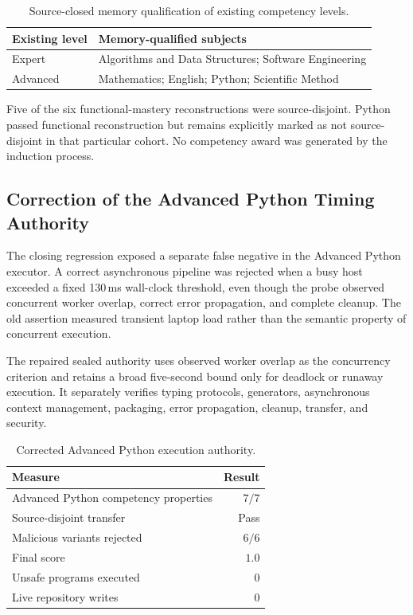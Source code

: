 \begin{table}[htbp]
\centering
\caption{Source-closed memory qualification of existing competency levels.}
\label{tab:memory-qualified-levels}
\begin{tabular}{ll}
\hline
\textbf{Existing level} & \textbf{Memory-qualified subjects} \\
\hline
Expert & Algorithms and Data Structures; Software Engineering \\
Advanced & Mathematics; English; Python; Scientific Method \\
\hline
\end{tabular}
\end{table}

Five of the six functional-mastery reconstructions were source-disjoint.
Python passed functional reconstruction but remains explicitly marked as not
source-disjoint in that particular cohort.  No competency award was generated
by the induction process.

\subsection{Correction of the Advanced Python Timing Authority}

The closing regression exposed a separate false negative in the Advanced
Python executor.  A correct asynchronous pipeline was rejected when a busy
host exceeded a fixed 130\,ms wall-clock threshold, even though the probe
observed concurrent worker overlap, correct error propagation, and complete
cleanup.  The old assertion measured transient laptop load rather than the
semantic property of concurrent execution.

The repaired sealed authority uses observed worker overlap as the concurrency
criterion and retains a broad five-second bound only for deadlock or runaway
execution.  It separately verifies typing protocols, generators, asynchronous
context management, packaging, error propagation, cleanup, transfer, and
security.

\begin{table}[htbp]
\centering
\caption{Corrected Advanced Python execution authority.}
\label{tab:advanced-python-authority}
\begin{tabular}{lr}
\hline
\textbf{Measure} & \textbf{Result} \\
\hline
Advanced Python competency properties & $7/7$ \\
Source-disjoint transfer & Pass \\
Malicious variants rejected & $6/6$ \\
Final score & $1.0$ \\
Unsafe programs executed & $0$ \\
Live repository writes & $0$ \\
\hline
\end{tabular}
\end{table}

